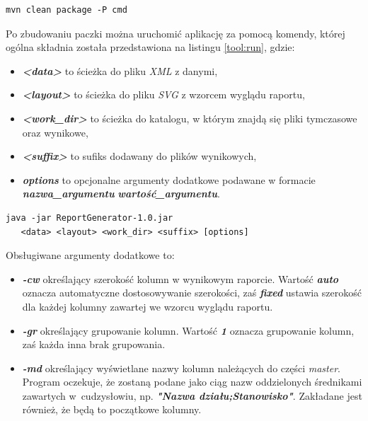 \documentclass[11pt,a4paper]{article}
\begin{document}
\lstset{language=sh}
\begin{lstlisting}[frame=single,caption=Komenda \emph{Mavena} budująca paczkę \emph{jar} z aplikacją,label=tool:build]
mvn clean package -P cmd
\end{lstlisting}

Po zbudowaniu paczki można uruchomić aplikację za pomocą komendy, której ogólna składnia została przedstawiona na listingu \ref{tool:run}, gdzie:
\begin{itemize}
	\item \emph{\textbf{\textless data\textgreater}} to ścieżka do pliku \emph{XML} z danymi,
	\item \emph{\textbf{\textless layout\textgreater}} to ścieżka do pliku \emph{SVG} z wzorcem wyglądu raportu,
	\item \emph{\textbf{\textless work\_dir\textgreater}} to ścieżka do katalogu, w którym znajdą się pliki tymczasowe oraz wynikowe,
	\item \emph{\textbf{\textless suffix\textgreater}} to sufiks dodawany do plików wynikowych,
	\item \emph{\textbf{options}} to opcjonalne argumenty dodatkowe podawane w formacie\\ \emph{\textbf{nazwa\_argumentu}} \emph{\textbf{wartość\_argumentu}}.
\end{itemize}
\lstset{language=sh}
\begin{lstlisting}[frame=single,caption=Komenda uruchamiająca aplikację,label=tool:run]
java -jar ReportGenerator-1.0.jar
   <data> <layout> <work_dir> <suffix> [options]
\end{lstlisting}


Obsługiwane argumenty dodatkowe to:
\begin{itemize}
	\item \emph{\textbf{-cw}} określający szerokość kolumn w wynikowym raporcie. Wartość \emph{\textbf{auto}} oznacza automatyczne dostosowywanie szerokości, zaś \emph{\textbf{fixed}} ustawia szerokość dla każdej kolumny zawartej we wzorcu wyglądu raportu.
	\item \emph{\textbf{-gr}} określający grupowanie kolumn. Wartość \emph{\textbf{1}} oznacza grupowanie kolumn, zaś każda inna brak grupowania.
	\item \emph{\textbf{-md}} określający wyświetlane nazwy kolumn należących do części \emph{master}. Program oczekuje, że zostaną podane jako ciąg nazw oddzielonych średnikami zawartych w~cudzysłowiu, np. \emph{\textbf{"Nazwa działu;Stanowisko"}}. Zakładane jest również, że będą to początkowe kolumny.
\end{itemize}
\end{document}
